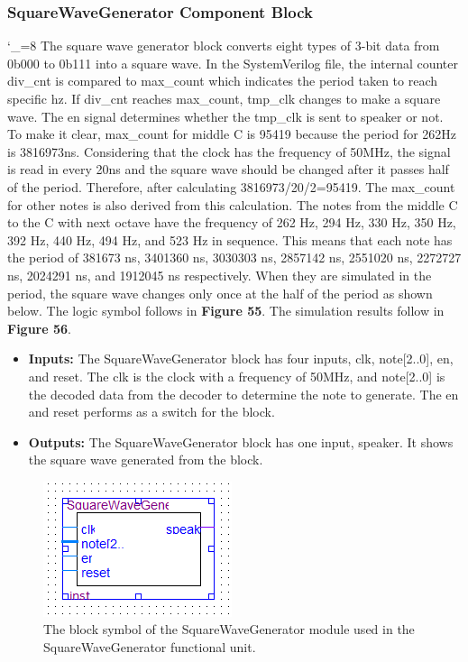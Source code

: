 \documentclass[a4paper]{article}
\begin{document}
\subsubsection{SquareWaveGenerator Component Block}
\catcode`_=8
The square wave generator block converts eight types of 3-bit data from 0b000 to 0b111 into a square wave. In the SystemVerilog file, the internal counter div\_cnt is compared to max\_count which indicates the period taken to reach specific hz. If div\_cnt reaches max\_count, tmp\_clk changes to make a square wave. The en signal determines whether the tmp\_clk is sent to speaker or not. To make it clear, max\_count for middle C is 95419 because the period for 262Hz is 3816973ns. Considering that the clock has the frequency of 50MHz, the signal is read in every 20ns and the square wave should be changed after it passes half of the period. Therefore, after calculating 3816973/20/2=95419. The max\_count for other notes is also derived from this calculation. The notes from the middle C to the C with next octave have the frequency of 262 Hz, 294 Hz, 330 Hz, 350 Hz, 392 Hz, 440 Hz, 494 Hz, and 523 Hz in sequence. This means that each note has the period of 381673 ns, 3401360 ns, 3030303 ns, 2857142 ns, 2551020 ns, 2272727 ns, 2024291 ns, and 1912045 ns respectively. When they are simulated in the period, the square wave changes only once at the half of the period as shown below. The logic symbol follows in \textbf{Figure 55}.  The simulation results follow in \textbf{Figure 56}.
\begin{itemize}
\item \textbf{Inputs:  } The SquareWaveGenerator block has four inputs, clk, note[2..0], en, and reset. The clk is the clock with a frequency of 50MHz, and note[2..0] is the decoded data from the decoder to determine the note to generate. The en and reset performs as a switch for the block.
\item \textbf{Outputs: } The SquareWaveGenerator block has one input, speaker. It shows the square wave generated from the block.
\end{itemize}
\begin{figure}[h]
\centering
\includegraphics[width=.48\textwidth]{functional_units/SquareWaveGenerator/individual_blocks/SquareWaveGenerator_symbol.png}
\caption{The block symbol of the SquareWaveGenerator module used in the SquareWaveGenerator functional unit.}
\end{figure}
\end{document}
